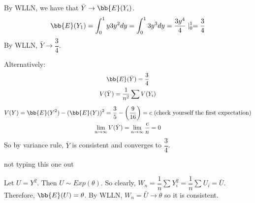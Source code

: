 \documentclass{article}
\begin{document}
\begin{soln}
By WLLN, we have that $ \bar{Y} \rightarrow \bb{E}(Y_{i}) $.
\begin{gather*}
    \bb{E}(Y_{1}) = \int_{0}^{1} y3y^{2}dy = \int_{0}^{1}3y^{3}dy = \dfrac{3y^{4}}{4} \mid^1_{0} = \dfrac{3}{4}
\end{gather*}
By WLLN, $ \bar{Y} \rightarrow \dfrac{3}{4} $. \npgh

Alternatively:
\begin{gather*}
\bb{E}(\bar{Y}) = \dfrac{3}{4} \\
V(\bar{Y}) = \dfrac{1}{n^{2}} \sum_{}^{} {V(Y_{i})} \\
V(Y) = \bb{E}(Y^{2}) - (\bb{E}(Y))^{2} = \dfrac{3}{5} - \left( \dfrac{9}{16} \right) = c \textrm{ (check yourself the first expectation)} \\
\lim_{n\rightarrow \infty}V(\bar{Y}) = \lim_{n \rightarrow \infty} \dfrac{c}{n} = 0
\end{gather*}
So by variance rule, $ \bar{Y} $ is consistent and converges to $ \dfrac{3}{4} $.
\end{soln}

\begin{qu}
not typing this one out
\end{qu}

\begin{soln}
Let $ U = Y^{2} $. Then $ U \sim Exp(\theta) $. So clearly, $ W_{n} = \dfrac{1}{n} \sum_{}^{} {Y_{i}^{2}} = \dfrac{1}{n} \sum_{}^{} {U_{i}} = \bar{U} $. \\
Therefore, $ \bb{E}(U) = \theta $. By WLLN, $ W_{n} = \bar{U} \rightarrow \theta $ so it is consistent.
\end{soln}
\end{document}
